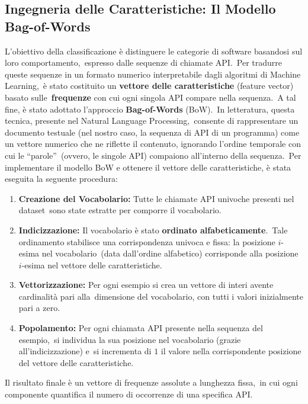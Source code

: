 \subsection{Ingegneria delle Caratteristiche: Il Modello Bag-of-Words}

L'obiettivo della classificazione è distinguere le categorie di software basandosi sul loro comportamento,\
espresso dalle sequenze di chiamate API.\
Per tradurre queste sequenze in un formato numerico interpretabile dagli algoritmi di Machine Learning,\
è stato costituito un \textbf{vettore delle caratteristiche} (feature vector) basato sulle\
\textbf{frequenze} con cui ogni singola API compare nella sequenza.\
A tal fine, è stato adottato l'approccio \textbf{Bag-of-Words} (BoW).\
In letteratura, questa tecnica, presente nel Natural Language Processing,\
consente di rappresentare un documento testuale (nel nostro caso, la sequenza di API di un programma)
come un vettore numerico che ne riflette il contenuto, ignorando l'ordine temporale con cui le ``parole''\
(ovvero, le singole API) compaiono all'interno della sequenza.\
Per implementare il modello BoW e ottenere il vettore delle caratteristiche, è stata eseguita la seguente procedura:

\begin{enumerate}
    \item \textbf{Creazione del Vocabolario:} Tutte le chiamate API univoche presenti nel dataset\
          sono state estratte per comporre il vocabolario.
    \item \textbf{Indicizzazione:} Il vocabolario è stato \textbf{ordinato alfabeticamente}.\
          Tale ordinamento stabilisce una corrispondenza univoca e fissa: la posizione $i$-esima nel vocabolario\
          (data dall'ordine alfabetico) corrisponde alla posizione $i$-esima nel vettore delle caratteristiche.
    \item \textbf{Vettorizzazione:} Per ogni esempio si crea un vettore di interi avente cardinalità pari alla\
          dimensione del vocabolario, con tutti i valori inizialmente pari a zero.
    \item \textbf{Popolamento:} Per ogni chiamata API presente nella sequenza del esempio,\
          si individua la sua posizione nel vocabolario (grazie all'indicizzazione) e\
          si incrementa di $1$ il valore nella corrispondente posizione del vettore delle caratteristiche.
\end{enumerate}

Il risultato finale è un vettore di frequenze assolute a lunghezza fissa,\
in cui ogni componente quantifica il numero di occorrenze di una specifica API.

